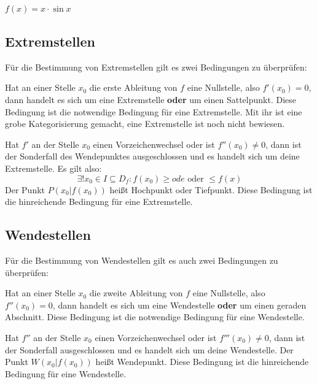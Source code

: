\documentclass[main.tex]{subfiles}
\begin{document}
\begin{Beispiel}
	$f(x)=x\cdot\sin{x}$
\end{Beispiel}


\subsection{Extremstellen}

Für die Bestimmung von Extremstellen gilt es zwei Bedingungen zu überprüfen:

Hat an einer Stelle $x_{0}$ die erste Ableitung von $f$ eine Nullstelle, also $f'(x_{0}) = 0$, dann handelt es sich um eine Extremstelle \textbf{oder} um einen Sattelpunkt. Diese Bedingung ist die notwendige Bedingung für eine Extremstelle. Mit ihr ist eine grobe Kategorisierung gemacht, eine Extremstelle ist noch nicht bewiesen.

Hat $f'$ an der Stelle $x_{0}$ einen Vorzeichenwechsel oder ist $f''(x_{0})\neq 0$, dann ist der Sonderfall des Wendepunktes ausgeschlossen und es handelt sich um deine Extremstelle. Es gilt also:
$$\exists! x_{0} \in I \subseteq D_{f} : f(x_{0}) \geq ode\text{ oder } \leq f(x)$$
Der Punkt $P(x_{0}|f(x_{0}))$ heißt Hochpunkt oder Tiefpunkt. Diese Bedingung ist die hinreichende Bedingung für eine Extremstelle.

\subsection{Wendestellen}

Für die Bestimmung von Wendestellen gilt es auch zwei Bedingungen zu überprüfen:

Hat an einer Stelle $x_{0}$ die zweite Ableitung von $f$ eine Nullstelle, also $f''(x_{0}) = 0$, dann handelt es sich um eine Wendestelle \textbf{oder} um einen geraden Abschnitt. Diese Bedingung ist die notwendige Bedingung für eine Wendestelle.

Hat $f''$ an der Stelle $x_{0}$ einen Vorzeichenwechsel oder ist $f'''(x_{0})\neq 0$, dann ist der Sonderfall ausgeschlossen und es handelt sich um deine Wendestelle. Der Punkt $W(x_{0}|f(x_{0}))$ heißt Wendepunkt. Diese Bedingung ist die hinreichende Bedingung für eine Wendestelle.
\end{document}
